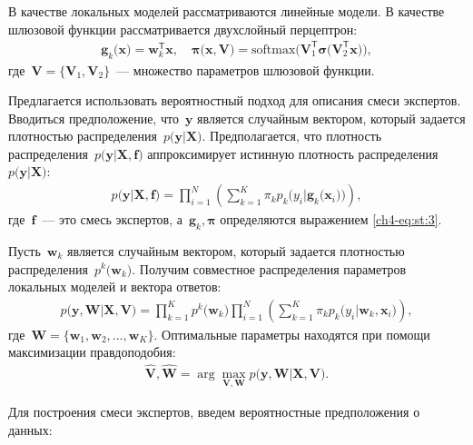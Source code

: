 \documentclass{dissert}
\begin{document}
В качестве локальных моделей рассматриваются линейные модели. В качестве шлюзовой функции рассматривается двухслойный перцептрон:
\[
\label{ch4-eq:st:3}
\begin{aligned}
\mathbf{g}_k\bigr(\textbf{x}\bigr) = \textbf{w}_k^{\mathsf{T}}\textbf{x}, \quad
\bm{\pi}\bigr(\mathbf{x}, \mathbf{V}\bigr) = \text{softmax}\bigr(\mathbf{V}_{1}^{\mathsf{T}}\bm{\sigma}\bigr(\mathbf{V}_2^{\mathsf{T}}\mathbf{x}\bigr)\bigr),
\end{aligned}
\]
где~$\mathbf{V} = \bigr\{\mathbf{V}_1, \mathbf{V}_2\bigr\}$~--- множество параметров шлюзовой функции.

Предлагается использовать вероятностный подход для описания смеси экспертов. Вводиться предположение, что~$\textbf{y}$ является случайным вектором, который задается плотностью распределения~$p\bigr(\textbf{y}|\textbf{X}\bigr)$. Предполагается, что плотность распределения~$p\bigr(\textbf{y}|\textbf{X}, \textbf{f}\bigr)$ аппроксимирует истинную плотность распределения~$p\bigr(\textbf{y}|\textbf{X}\bigr)$:
\[
\label{ch4-eq:st:new:1}
\begin{aligned}
p\bigr(\textbf{y}|\textbf{X}, \textbf{f}\bigr) = \prod_{i=1}^{N}\left(\sum_{k=1}^{K}\pi_kp_{k}\bigr(y_{i}|\textbf{g}_{k}\bigr(\mathbf{x}_{i}\bigr)\bigr)\right),
\end{aligned}
\]
где~$\textbf{f}$~--- это смесь экспертов, а~$\textbf{g}_k, \bm{\pi}$ определяются выражением \eqref{ch4-eq:st:3}.

Пусть~$\textbf{w}_k$ является случайным вектором, который задается плотностью распределения~$p^{k}\bigr(\mathbf{w}_k\bigr)$. Получим совместное распределения параметров локальных моделей и вектора ответов:
\[
\label{ch4-eq:st:4}
\begin{aligned}
p\bigr(\mathbf{y}, \mathbf{W}|\mathbf{X}, \mathbf{V}\bigr) = \prod_{k=1}^{K}p^{k}\bigr(\mathbf{w}_k\bigr)\prod_{i=1}^{N}\left(\sum_{k=1}^{K}\pi_{k}p_{k}\bigr(y_i|\mathbf{w}_k, \mathbf{x}_i\bigr)\right),
\end{aligned}
\]
где~$\mathbf{W} = \bigr\{\mathbf{w}_1, \mathbf{w}_2, \ldots, \mathbf{w}_K\bigr\}.$
Оптимальные параметры находятся при помощи максимизации правдоподобия:
\[
\label{ch4-eq:st:5}
\begin{aligned}
\hat{\mathbf{V}}, \hat{ \mathbf{W}} = \arg\max_{\mathbf{V}, \mathbf{W}} p\bigr(\mathbf{y},  \mathbf{W}|\mathbf{X}, \mathbf{V}\bigr).
\end{aligned}
\]

Для построения смеси экспертов, введем вероятностные предположения о данных:
\end{document}
